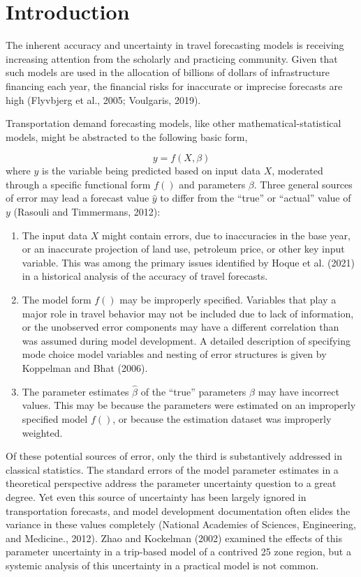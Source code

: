 \documentclass[
  futuretransp,
  submit,
  moreauthors,
]{Definitions/mdpi}
\providecommand{\tightlist}{%
  \setlength{\itemsep}{0pt}\setlength{\parskip}{0pt}}
\begin{document}
\section{Introduction}\label{introduction}

The inherent accuracy and uncertainty in travel forecasting models is
receiving increasing attention from the scholarly and practicing
community. Given that such models are used in the allocation of billions
of dollars of infrastructure financing each year, the financial risks
for inaccurate or imprecise forecasts are high (Flyvbjerg et al., 2005;
Voulgaris, 2019).

Transportation demand forecasting models, like other
mathematical-statistical models, might be abstracted to the following
basic form,

\[
y = f(X, \beta)
\]where \(y\) is the variable being predicted based on input data \(X\),
moderated through a specific functional form \(f()\) and parameters
\(\beta\). Three general sources of error may lead a forecast value
\(\hat{y}\) to differ from the ``true'' or ``actual'' value of \(y\)
(Rasouli and Timmermans, 2012):

\begin{enumerate}
\def\labelenumi{\arabic{enumi}.}
\tightlist
\item
  The input data \(X\) might contain errors, due to inaccuracies in the
  base year, or an inaccurate projection of land use, petroleum price,
  or other key input variable. This was among the primary issues
  identified by Hoque et al. (2021) in a historical analysis of the
  accuracy of travel forecasts.
\item
  The model form \(f()\) may be improperly specified. Variables that
  play a major role in travel behavior may not be included due to lack
  of information, or the unobserved error components may have a
  different correlation than was assumed during model development. A
  detailed description of specifying mode choice model variables and
  nesting of error structures is given by Koppelman and Bhat (2006).
\item
  The parameter estimates \(\hat{\beta}\) of the ``true'' parameters
  \(\beta\) may have incorrect values. This may be because the
  parameters were estimated on an improperly specified model \(f()\), or
  because the estimation dataset was improperly weighted.
\end{enumerate}

Of these potential sources of error, only the third is substantively
addressed in classical statistics. The standard errors of the model
parameter estimates in a theoretical perspective address the parameter
uncertainty question to a great degree. Yet even this source of
uncertainty has been largely ignored in transportation forecasts, and
model development documentation often elides the variance in these
values completely (National Academies of Sciences, Engineering, and
Medicine., 2012). Zhao and Kockelman (2002) examined the effects of this
parameter uncertainty in a trip-based model of a contrived 25 zone
region, but a systemic analysis of this uncertainty in a practical model
is not common.
\end{document}
